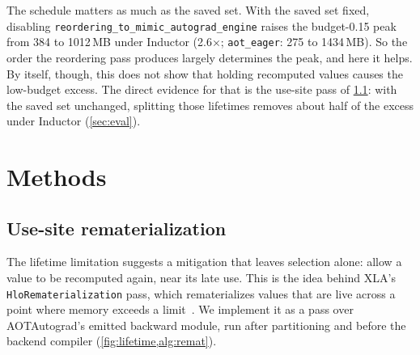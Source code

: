 \documentclass[10pt]{article}
\newcommand{\code}[1]{\texttt{#1}}
\begin{document}
The schedule matters as much as the saved set. With the saved set fixed, disabling
\code{reordering\_to\_mimic\allowbreak\_autograd\_engine} raises the budget-0.15 peak from 384 to 1012\,MB under Inductor
(2.6$\times$; \code{aot\_eager}: 275 to 1434\,MB). So the order the reordering pass produces largely
determines the peak, and here it helps. By itself, though, this does not show that holding recomputed values causes the low-budget
excess. The direct evidence for that is the use-site pass of \cref{sec:remat}: with the saved set unchanged, splitting
those lifetimes removes about half of the excess under Inductor (\cref{sec:eval}).

\section{Methods}
\label{sec:methods}

\subsection{Use-site rematerialization}
\label{sec:remat}
The lifetime limitation suggests a mitigation that leaves selection alone: allow a value to be recomputed again, near
its late use. This is the idea behind XLA's \code{HloRematerialization} pass, which rematerializes values that are live
across a point where memory exceeds a limit~\citep{xlaremat}. We implement it as a pass over AOTAutograd's emitted
backward module, run after partitioning and before the backend compiler (\cref{fig:lifetime,alg:remat}).
\end{document}
